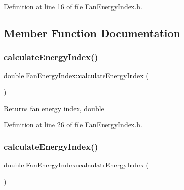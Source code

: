 Definition at line 16 of file Fan\+Energy\+Index.\+h.



\subsection{Member Function Documentation}
\mbox{\label{class_fan_energy_index_ab1bf0268caaed615a5f00027b3801198}} 
\subsubsection{\texorpdfstring{calculate\+Energy\+Index()}{calculateEnergyIndex()}\hspace{0.1cm}{\footnotesize\ttfamily [1/3]}}
{\footnotesize\ttfamily double Fan\+Energy\+Index\+::calculate\+Energy\+Index (\begin{DoxyParamCaption}{ }\end{DoxyParamCaption})\hspace{0.3cm}{\ttfamily [inline]}}

\begin{DoxyReturn}{Returns}
fan energy index, double 
\end{DoxyReturn}


Definition at line 26 of file Fan\+Energy\+Index.\+h.

\mbox{\label{class_fan_energy_index_ab1bf0268caaed615a5f00027b3801198}} 
\subsubsection{\texorpdfstring{calculate\+Energy\+Index()}{calculateEnergyIndex()}\hspace{0.1cm}{\footnotesize\ttfamily [2/3]}}
{\footnotesize\ttfamily double Fan\+Energy\+Index\+::calculate\+Energy\+Index (\begin{DoxyParamCaption}{ }\end{DoxyParamCaption})\hspace{0.3cm}{\ttfamily [inline]}}

